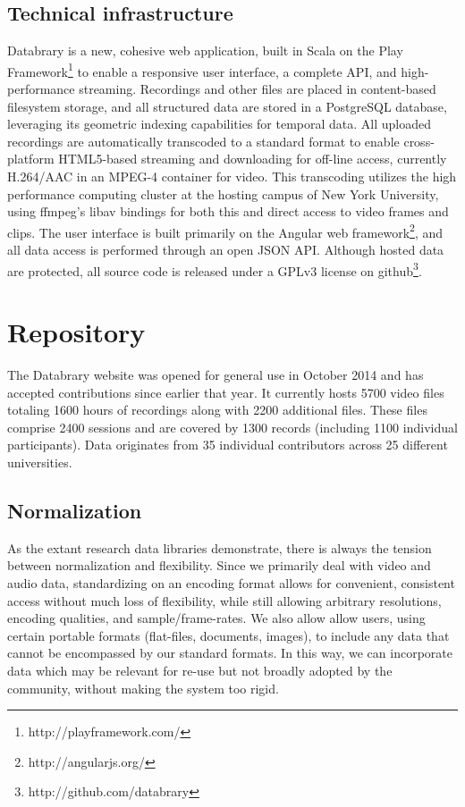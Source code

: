 \documentclass{sig-alternate}
\begin{document}
\subsection{Technical infrastructure}

Databrary is a new, cohesive web application, built in Scala on the Play Framework\footnote{http://playframework.com/} to enable a responsive user interface, a complete API, and high-performance streaming.
Recordings and other files are placed in content-based filesystem storage, and all structured data are stored in a PostgreSQL database, leveraging its geometric indexing capabilities for temporal data.
All uploaded recordings are automatically transcoded to a standard format to enable cross-platform HTML5-based streaming and downloading for off-line access, currently H.264/AAC in an MPEG-4 container for video.
This transcoding utilizes the high performance computing cluster at the hosting campus of New York University, using ffmpeg's libav bindings for both this and direct access to video frames and clips.
The user interface is built primarily on the Angular web framework\footnote{http://angularjs.org/}, and all data access is performed through an open JSON API.
Although hosted data are protected, all source code is released under a GPLv3 license on github\footnote{http://github.com/databrary}.

\section{Repository}

The Databrary website was opened for general use in October 2014 and has accepted contributions since earlier that year.
It currently hosts 5700 video files totaling 1600 hours of recordings along with 2200 additional files.
These files comprise 2400 sessions and are covered by 1300 records (including 1100 individual participants).
Data originates from 35 individual contributors across 25 different universities.

\subsection{Normalization}

As the extant research data libraries demonstrate, there is always the tension between normalization and flexibility.
Since we primarily deal with video and audio data, standardizing on an encoding format allows for convenient, consistent access without much loss of flexibility, while still allowing arbitrary resolutions, encoding qualities, and sample/frame-rates.
We also allow allow users, using certain portable formats (flat-files, documents, images), to include any data that cannot be encompassed by our standard formats.
In this way, we can incorporate data which may be relevant for re-use but not broadly adopted by the community, without making the system too rigid.
\end{document}
